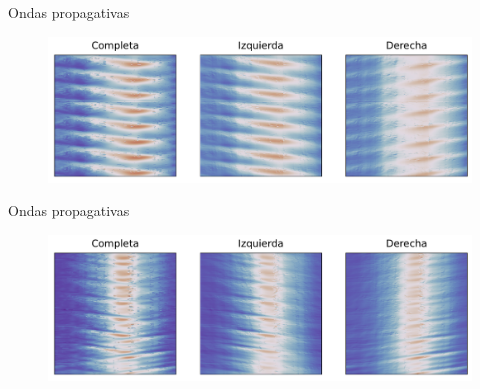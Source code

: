 \documentclass[aspectratio=169]{beamer}
\begin{document}
\begin{frame}{Ondas propagativas} %
	\begin{figure}[ht]
		\centering
		\includegraphics[width=\textwidth]{figs/st_left_right_taylor_couette.pdf}
	\end{figure}
\end{frame}

\begin{frame}{Ondas propagativas}
	\begin{figure}[ht]
		\centering
		\includegraphics[width=\textwidth]{figs/st_left_right_med33.pdf}
	\end{figure}
\end{frame}
\end{document}
